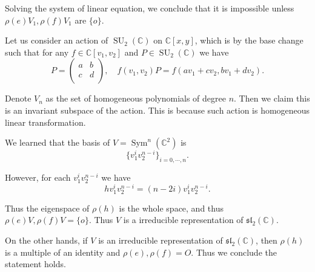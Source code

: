 \documentclass{article}
\numberwithin{equation}{section}
\DeclareMathOperator{\SU}{SU}
\DeclareMathOperator{\Sym}{Sym}
\begin{document}
Solving the system of linear equation, we conclude that it is impossible unless $\rho(e)V_1,\rho(f)V_1$ are $\{o\}$.\\

\par Let us consider an action of $\SU_2(\mathbb{C})$ on $\mathbb{C}[x,y]$, which is by the base change such that for any $f\in\mathbb{C}[v_1,v_2]$ and $P\in\SU_2(\mathbb{C})$ we have
\begin{equation*}
P=\begin{pmatrix}a&b\\c&d\\\end{pmatrix},\quad f(v_1,v_2)P = f(av_1+cv_2,bv_1+dv_2).
\end{equation*}
\par Denote $V_n$ as the set of homogeneous polynomials of degree $n$. Then we claim this is an invariant subspace of the action. This is because such action is homogeneous linear transformation.\\

\par We learned that the basis of $V=\Sym^n(\mathbb{C}^2)$ is
\begin{equation*}
\{v_1^iv_2^{n-i}\}_{i=0,\cdots,n}.
\end{equation*}

However, for each $v_1^iv_2^{n-i}$ we have
\begin{equation*}
hv_1^iv_2^{n-i} = (n-2i)v_1^iv_2^{n-i}.
\end{equation*}

\par Thus the eigenspace of $\rho(h)$ is the whole space, and thus $\rho(e)V,\rho(f)V=\{o\}$. Thus $V$ is a irreducible representation of $\mathfrak{sl}_2(\mathbb{C})$.\\

\par On the other hands, if $V$ is an irreducible representation of $\mathfrak{sl}_2(\mathbb{C})$, then $\rho(h)$ is a multiple of an identity and $\rho(e),\rho(f)=O$. Thus we conclude the statement holds.
\end{document}
